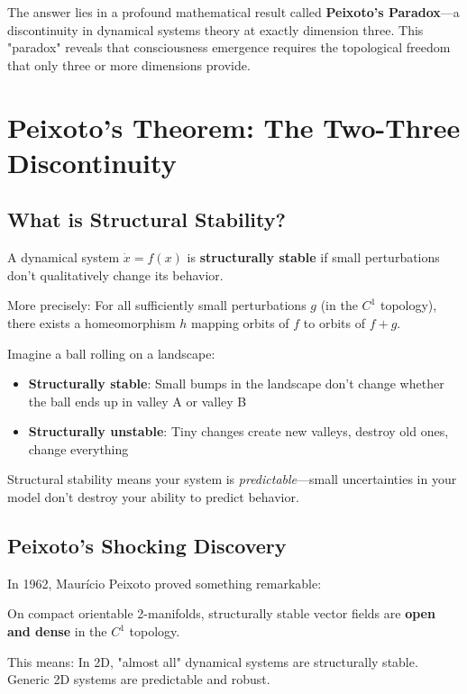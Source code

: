 The answer lies in a profound mathematical result called \textbf{Peixoto's Paradox}—a discontinuity in dynamical systems theory at exactly dimension three. This "paradox" reveals that consciousness emergence requires the topological freedom that only three or more dimensions provide.

\section{Peixoto's Theorem: The Two-Three Discontinuity}

\subsection{What is Structural Stability?}

\begin{defn}\label{def:structural-stability}
A dynamical system $\dot{x} = f(x)$ is \textbf{structurally stable} if small perturbations don't qualitatively change its behavior.

More precisely: For all sufficiently small perturbations $g$ (in the $C^1$ topology), there exists a homeomorphism $h$ mapping orbits of $f$ to orbits of $f + g$.
\end{defn}

\begin{intuitive}
Imagine a ball rolling on a landscape:
\begin{itemize}
\item \textbf{Structurally stable}: Small bumps in the landscape don't change whether the ball ends up in valley A or valley B
\item \textbf{Structurally unstable}: Tiny changes create new valleys, destroy old ones, change everything
\end{itemize}

Structural stability means your system is \textit{predictable}—small uncertainties in your model don't destroy your ability to predict behavior.
\end{intuitive}

\subsection{Peixoto's Shocking Discovery}

In 1962, Maurício Peixoto proved something remarkable:

\begin{thm}\label{thm:peixoto}
On compact orientable 2-manifolds, structurally stable vector fields are \textbf{open and dense} in the $C^1$ topology.

This means: In 2D, "almost all" dynamical systems are structurally stable. Generic 2D systems are predictable and robust.
\end{thm}

